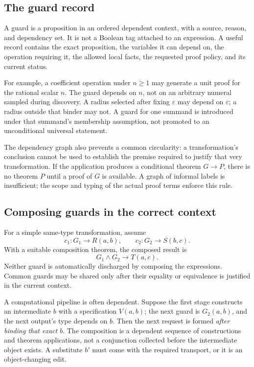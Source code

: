 \documentclass[11pt,a4paper]{article}
\theoremstyle{remark}\newtheorem{example}[proposition]{Example}
\begin{document}
\subsection{The guard record}
A guard is a proposition in an ordered dependent context, with a source, reason, and dependency set. It is not a Boolean tag attached to an expression. A useful record contains the exact proposition, the variables it can depend on, the operation requiring it, the allowed local facts, the requested proof policy, and its current status.

For example, a coefficient operation under $n\geq1$ may generate a unit proof for the rational scalar $n$. The guard depends on $n$, not on an arbitrary numeral sampled during discovery. A radius selected after fixing $\varepsilon$ may depend on $\varepsilon$; a radius outside that binder may not. A guard for one summand is introduced under that summand's membership assumption, not promoted to an unconditional universal statement.

The dependency graph also prevents a common circularity: a transformation's conclusion cannot be used to establish the premise required to justify that very transformation. If the application produces a conditional theorem $G\to P$, there is no theorem $P$ until a proof of $G$ is available. A graph of informal labels is insufficient; the scope and typing of the actual proof terms enforce this rule.

\subsection{Composing guards in the correct context}
For a simple same-type transformation, assume
\[
 c_1:G_1\to R(a,b),\qquad
 c_2:G_2\to S(b,c).
\]
With a suitable composition theorem, the composed result is
\[
 G_1\land G_2\to T(a,c).
\]
Neither guard is automatically discharged by composing the expressions. Common guards may be shared only after their equality or equivalence is justified in the current context.

A computational pipeline is often dependent. Suppose the first stage constructs an intermediate $b$ with a specification $V(a,b)$; the next guard is $G_2(a,b)$, and the next output's type depends on $b$. Then the next request is formed \emph{after binding that exact $b$}. The composition is a dependent sequence of constructions and theorem applications, not a conjunction collected before the intermediate object exists. A substitute $b'$ must come with the required transport, or it is an object-changing edit.
\end{document}

